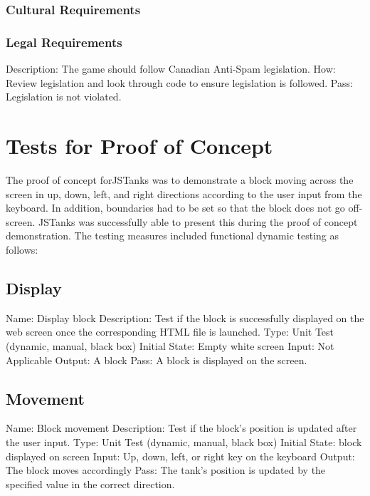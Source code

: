 \documentclass{article}
\begin{document}
\subsubsection{Cultural Requirements}


\subsubsection{Legal Requirements}
 Description: The game should follow Canadian Anti-Spam legislation. \newline
 How: Review legislation and look through code to ensure legislation is 
 followed. \newline
 Pass: Legislation is not violated.



\section{Tests for Proof of Concept}
The proof of concept forJSTanks was to demonstrate a block moving across the 
screen in up, down, left, and right directions according to the user input 
from the keyboard. In addition, boundaries had to be set so that the block 
does not go off-screen. JSTanks was successfully able to present this during 
the proof of concept demonstration. The testing measures included functional 
dynamic testing as follows:
\subsection{Display}
Name: Display block\newline
Description: Test if the block is successfully displayed on the web screen 
once the corresponding HTML file is launched.\newline
Type: Unit Test (dynamic, manual, black box)\newline
Initial State: Empty white screen\newline
Input: Not Applicable\newline
Output: A block\newline
Pass: A block is displayed on the screen.
\subsection{Movement}
Name: Block movement\newline
Description: Test if the block’s position is updated after the user input.
\newline
Type: Unit Test (dynamic, manual, black box)\newline
Initial State: block displayed on screen\newline
Input: Up, down, left, or right key on the keyboard\newline
Output: The block moves accordingly\newline
Pass: The tank’s position is updated by the specified value in the correct 
direction.
\end{document}
